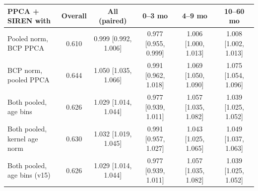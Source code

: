 \begin{tabular}{lccccc}
\toprule
PPCA + SIREN with & Overall & All (paired) & 0--3 mo & 4--9 mo & 10--60 mo \\
\midrule
Pooled norm, BCP PPCA & 0.610 & 0.999 [0.992, 1.006] & 0.977 [0.955, 0.999] & 1.006 [1.000, 1.013] & 1.008 [1.002, 1.013] \\
BCP norm, pooled PPCA & 0.644 & 1.050 [1.035, 1.066] & 0.991 [0.962, 1.018] & 1.069 [1.050, 1.090] & 1.075 [1.054, 1.096] \\
Both pooled, age bins & 0.626 & 1.029 [1.014, 1.044] & 0.977 [0.939, 1.011] & 1.057 [1.035, 1.082] & 1.039 [1.025, 1.052] \\
Both pooled, kernel age norm & 0.630 & 1.032 [1.019, 1.045] & 0.991 [0.957, 1.027] & 1.043 [1.025, 1.065] & 1.049 [1.037, 1.063] \\
Both pooled, age bins (v15) & 0.626 & 1.029 [1.014, 1.044] & 0.977 [0.939, 1.011] & 1.057 [1.035, 1.082] & 1.039 [1.025, 1.052] \\
\bottomrule
\end{tabular}
